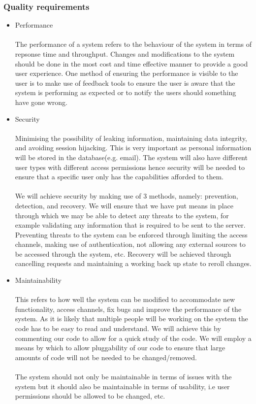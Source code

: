 \documentclass[a4paper]{article}
\begin{document}
    \subsubsection{Quality requirements}
    \begin{itemize}
     \begin{itemize}
    \item Performance \\\\
        The performance of a system refers to the behaviour of the system in terms of repsonse time and throughput. Changes and modifications to the system should be done in the most cost and time effective manner to provide a good user experience.
        One method of ensuring the performance is visible to the user is to make use of feedback tools to ensure the user is aware that the system is performing as expected or to notify the users should something have gone wrong.  
    \item Security \\\\
        Minimising the possibility of leaking information, maintaining data integrity, and avoiding session hijacking. This is very important as personal information will be stored in the database(e.g. email). The system will also have different user types with different access permissions hence security will be needed to ensure that a specific user only has the capabilities afforded to them. 
        \\\\
        We will achieve security by making use of 3 methods, namely: prevention, detection, and recovery.
        We will ensure that we have put means in place through which we may be able to detect any threats to the system, for example validating any information that is required to be sent to the server. Preventing threats to the system can be enforced through limiting the access channels, making use of authentication, not allowing any external sources to be accessed through the system, etc. Recovery will be achieved through cancelling requests and maintaining a working back up state to reroll changes.
    \item Maintainability \\\\
        This refers to how well the system can be modified to accommodate new functionality, access channels, fix bugs and improve the performance of the system. As it is likely that multiple people will be working on the system the code has to be easy to read and understand. We will achieve this by commenting our code to allow for a quick study of the code. We will employ a means by which to allow pluggability of our code to ensure that large amounts of code will not be needed to be changed/removed.
        \\\\
        The system should not only be maintainable in terms of issues with the system but it should also be maintainable in terms of usability, i.e user permissions should be allowed to be changed, etc.
        

\end{itemize}
\end{itemize}
\end{document}
